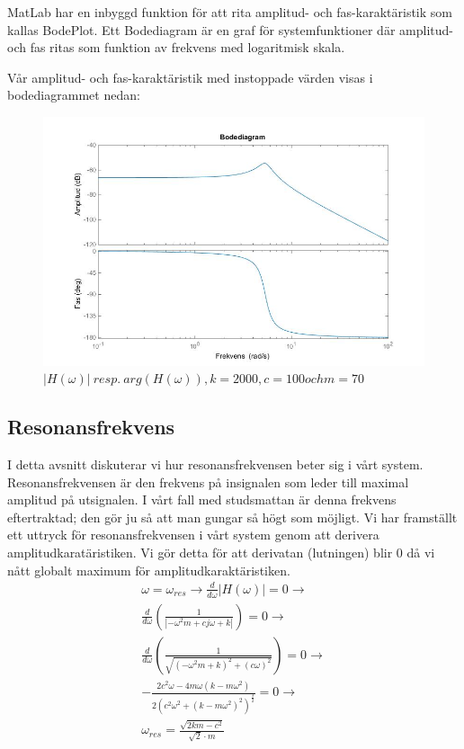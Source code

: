\documentclass[10pt,a4paper]{article}
\begin{document}
MatLab har en inbyggd funktion för att rita amplitud- och fas-karaktäristik som kallas BodePlot. Ett Bodediagram är en graf för systemfunktioner där amplitud- och fas ritas som funktion av frekvens med logaritmisk skala.

Vår amplitud- och fas-karaktäristik med instoppade värden visas i bodediagrammet nedan:


\begin{figure}[h]
\begin{center}
\includegraphics[scale=0.5]{BodePlot(FasAmpKar)}
\caption{$|H(\omega)| \ resp. \ arg(H(\omega)), k = 2000, c = 100 och m = 70$ }
\end{center}
\end{figure}

\newpage


\subsection{Resonansfrekvens}
I detta avsnitt diskuterar vi hur resonansfrekvensen beter sig i vårt system. Resonansfrekvensen är den frekvens på insignalen som leder till maximal amplitud på utsignalen. I vårt fall med studsmattan är denna frekvens eftertraktad; den gör ju så att man gungar så högt som möjligt. Vi har framställt ett uttryck för resonansfrekvensen i vårt system genom att derivera amplitudkaratäristiken. Vi gör detta för att derivatan (lutningen) blir 0 då vi nått globalt maximum för amplitudkaraktäristiken.
\begin{equation}
\begin{split}
\omega=\omega_{res} \rightarrow \frac{d}{d\omega}\left|H(\omega)\right|=0\rightarrow \\ 
\frac{d}{d\omega}\left(\frac{1}{\left|-\omega^2m+cj\omega+k\right|}\right)=0 \rightarrow \\
\frac{d}{d\omega}\left(\frac{1}{\sqrt{(-\omega^2m+k)^2+(c\omega)^2}}\right)=0 \rightarrow \\
-\frac{2c^2\omega-4m\omega(k-m\omega^2)}{2(c^2\omega^2+(k-m\omega^2)^2)^{\frac{3}{2}}}=0 \rightarrow \\
\omega_{res}= \frac{\sqrt{2km - c^2}}{\sqrt{2} \cdot m}
\end{split}
\end{equation}
\end{document}
